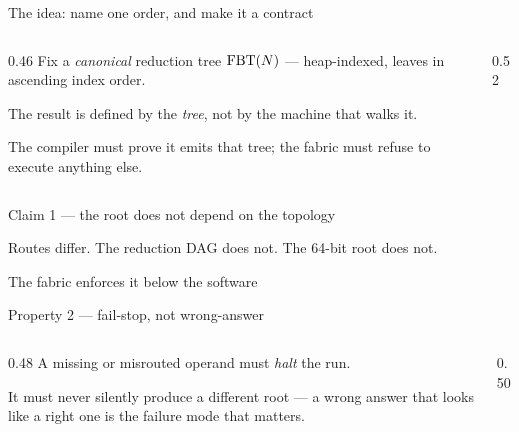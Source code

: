 \documentclass[aspectratio=169,10pt]{beamer}
\begin{document}
\begin{frame}{The idea: name one order, and make it a contract}
\begin{columns}[T]
\begin{column}{0.46\textwidth}\small
Fix a \emph{canonical} reduction tree $\mathrm{FBT}(N)$ --- heap-indexed, leaves in
ascending index order.

\vspace{4pt}
The result is defined by the \emph{tree}, not by the machine that walks it.

\vspace{4pt}
The compiler must prove it emits that tree; the fabric must refuse to execute
anything else.
\end{column}
\begin{column}{0.52\textwidth}
\end{column}
\end{columns}
\end{frame}

\begin{frame}{Claim 1 --- the root does not depend on the topology}
\vspace{-2pt}
\begin{center}\small
Routes differ. The reduction DAG does not. The 64-bit root does not.
\end{center}
\end{frame}

\begin{frame}{The fabric enforces it below the software}
\end{frame}

\begin{frame}{Property 2 --- fail-stop, not wrong-answer}
\begin{columns}[T]
\begin{column}{0.48\textwidth}\small
A missing or misrouted operand must \emph{halt} the run.

\vspace{4pt}
It must never silently produce a different root --- a wrong answer that looks
like a right one is the failure mode that matters.
\end{column}
\begin{column}{0.50\textwidth}
\end{column}
\end{columns}
\end{frame}
\end{document}
